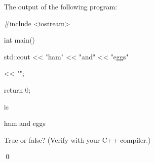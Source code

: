 The output of the following program:

\begin{console}

#include <iostream>



int main()

{

    std::cout << "ham" << "and" << "eggs"

              << "\n";

      

    return 0;

}

\end{console}

is

\begin{console}

ham and eggs

\end{console}

True or false? (Verify with your C++ compiler.)

\qed

